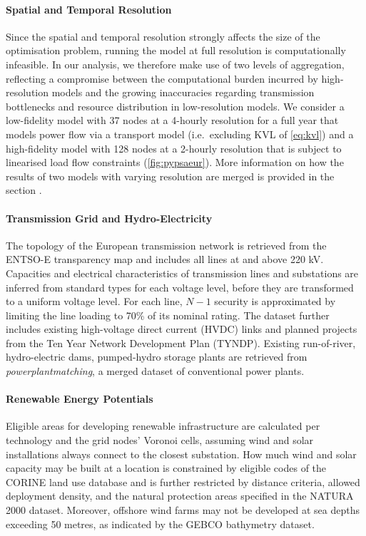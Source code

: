 \paragraph{Spatial and Temporal Resolution}
Since the spatial and temporal resolution strongly affects the size of the
optimisation problem, running the model at full resolution is computationally
infeasible. In our analysis, we therefore make use of two levels of aggregation,
reflecting a compromise between the computational burden incurred by
high-resolution models and the growing inaccuracies regarding transmission
bottlenecks and resource distribution in low-resolution models. We consider a
low-fidelity model with 37 nodes at a 4-hourly resolution for a full year that
models power flow via a transport model (i.e.~excluding KVL of \cref{eq:kvl})
and a high-fidelity model with 128 nodes at a 2-hourly resolution that is
subject to linearised load flow constraints (\cref{fig:pypsaeur}). More
information on how the results of two models with varying resolution are merged
is provided in the section .


\paragraph{Transmission Grid and Hydro-Electricity}
The topology of the European transmission network is retrieved from the ENTSO-E
transparency map and includes all lines at and above 220 kV. Capacities and
electrical characteristics of transmission lines and substations are inferred
from standard types for each voltage level, before they are transformed to a
uniform voltage level. For each line, $N-1$ security is approximated by limiting
the line loading to 70\% of its nominal rating. The dataset further includes
existing high-voltage direct current (HVDC) links and planned projects from the
Ten Year Network Development Plan (TYNDP). Existing run-of-river, hydro-electric
dams, pumped-hydro storage plants are retrieved from
\textit{powerplantmatching}, a merged dataset of conventional power plants.


\paragraph{Renewable Energy Potentials}
Eligible areas for developing renewable infrastructure are calculated per
technology and the grid nodes' Voronoi cells, assuming wind and solar
installations always connect to the closest substation. How much wind and solar
capacity may be built at a location is constrained by eligible codes of the
CORINE land use database and is further restricted by distance criteria, allowed
deployment density, and the natural protection areas specified in the NATURA
2000 dataset. Moreover, offshore wind farms may not be developed at sea depths
exceeding 50 metres, as indicated by the GEBCO bathymetry dataset.


